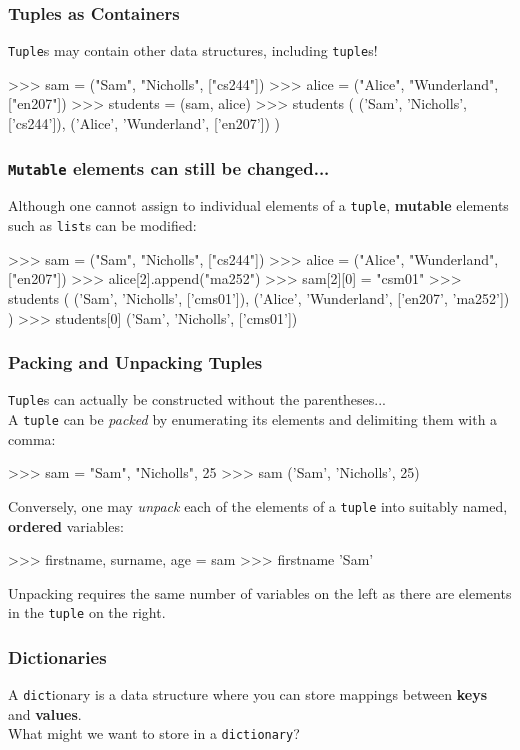 \documentclass{beamer}
\begin{document}
\begin{frame}[fragile]
\frametitle{Tuples as Containers}
    \texttt{Tuple}s may contain other data structures, including \texttt{tuple}s!

\begin{code}
>>> sam = ("Sam", "Nicholls", ["cs244"])
>>> alice = ("Alice", "Wunderland", ["en207"])
>>> students = (sam, alice)
>>> students
(
    ('Sam', 'Nicholls', ['cs244']),
    ('Alice', 'Wunderland', ['en207'])
)
\end{code}
\end{frame}

\begin{frame}[fragile]
\frametitle{\texttt{Mutable} elements can still be changed...}
Although one cannot assign to individual elements of a \texttt{tuple}, \textbf{mutable}
elements such as \texttt{list}s can be modified:
\begin{code}
>>> sam = ("Sam", "Nicholls", ["cs244"])
>>> alice = ("Alice", "Wunderland", ["en207"])
>>> alice[2].append("ma252")
>>> sam[2][0] = "csm01"
>>> students
(
    ('Sam', 'Nicholls', ['cms01']),
    ('Alice', 'Wunderland', ['en207', 'ma252'])
)
>>> students[0]
('Sam', 'Nicholls', ['cms01'])
\end{code}
\end{frame}


\begin{frame}[fragile]
\frametitle{Packing and Unpacking Tuples}
\texttt{Tuple}s can actually be constructed without the parentheses...\\
A \texttt{tuple} can be \textit{packed} by enumerating its elements
and delimiting them with a comma:

\begin{code}
>>> sam = "Sam", "Nicholls", 25
>>> sam
('Sam', 'Nicholls', 25)
\end{code}

\vskip 0.3cm
Conversely, one may \textit{unpack} each of the elements of a \texttt{tuple}
    into suitably named, \textbf{ordered} variables:
\begin{code}
>>> firstname, surname, age = sam
>>> firstname
'Sam'
\end{code}
Unpacking requires the same number of variables on the left as there
    are elements in the \texttt{tuple} on the right.
\end{frame}

\begin{frame}[fragile]
\frametitle{Dictionaries}
    A \texttt{dict}ionary is a data structure where you can store
    mappings between \textbf{keys} and \textbf{values}.\\
    \bigskip
    What might we want to store in a \texttt{dictionary}?
\end{frame}
\end{document}
